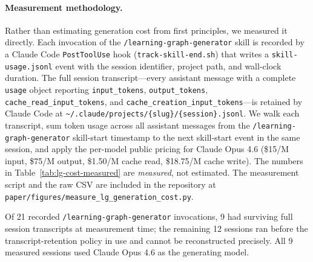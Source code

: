 \paragraph{Measurement methodology.}
Rather than estimating generation cost from first principles, we measured
it directly. Each invocation of the \texttt{/learning-graph-generator}
skill is recorded by a Claude Code \texttt{PostToolUse} hook
(\texttt{track-skill-end.sh}) that writes a \texttt{skill-usage.jsonl}
event with the session identifier, project path, and wall-clock
duration. The full session transcript---every assistant message with a
complete \texttt{usage} object reporting \texttt{input\_tokens},
\texttt{output\_tokens}, \texttt{cache\_read\_input\_tokens}, and
\texttt{cache\_creation\_input\_tokens}---is retained by Claude Code at
\texttt{\textasciitilde/.claude/projects/\{slug\}/\{session\}.jsonl}. We
walk each transcript, sum token usage across all assistant messages from
the \texttt{/learning-graph-generator} skill-start timestamp to the next
skill-start event in the same session, and apply the per-model public
pricing for Claude Opus 4.6
(\$15/M input, \$75/M output, \$1.50/M cache read, \$18.75/M cache
write). The numbers in Table~\ref{tab:lg-cost-measured} are
\emph{measured}, not estimated. The measurement script and the raw CSV
are included in the repository at
\texttt{paper/figures/measure\_lg\_generation\_cost.py}.

Of 21 recorded \texttt{/learning-graph-generator} invocations, 9 had
surviving full session transcripts at measurement time; the remaining 12
sessions ran before the transcript-retention policy in use and cannot be
reconstructed precisely. All 9 measured sessions used Claude Opus 4.6 as
the generating model.

\begin{table}[htbp]
\centering
\small
\caption{Measured token consumption and cost for nine complete
\texttt{/learning-graph-generator} sessions, sorted by concept count.
Costs reflect Claude Opus 4.6 public API pricing at measurement
time.\protect\footnotemark{} Cached column sums cache-read and
cache-write tokens, which dominate total volume because the growing
graph is re-attached to each assistant turn.}
\label{tab:lg-cost-measured}

\end{table}

